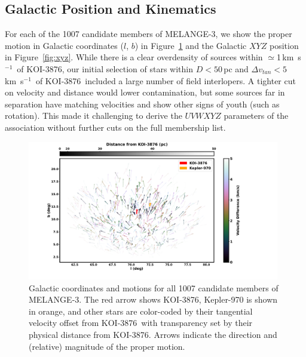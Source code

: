 \documentclass[twocolumn, linenumbers]{aastex631}
\newcommand{\association}{MELANGE-3}
\newcommand{\starname}{KOI-3876}
\newcommand\kms{km~s$^{-1}$}
\begin{document}


\subsection{Galactic Position and Kinematics}\label{sec:kinametics}

For each of the 1007 candidate members of \association, we show the proper motion in Galactic coordinates ($l$, $b$) in Figure~\ref{fig:ProperMotion} and the Galactic $XYZ$ position in Figure~\ref{fig:xyz}. While there is a clear overdensity of sources within $\simeq$1\,\kms\ of \starname, our initial selection of stars within $D < 50$\,pc and $\Delta v_{tan} < 5$\,\kms\ of \starname\ included a large number of field interlopers. A tighter cut on velocity and distance would lower contamination, but some sources far in separation have matching velocities and show other signs of youth (such as rotation). This made it challenging to derive the $UVWXYZ$ parameters of the association without further cuts on the full membership list.

\begin{figure}[tbhp]
    \centering
    \includegraphics[trim=90 0 150 0,clip=true,width=0.98\textwidth]{propmotion.pdf}
    \caption{Galactic coordinates and motions for all 1007 candidate members of \association. The red arrow shows \starname, Kepler-970 is shown in orange, and other stars are color-coded by their tangential velocity offset from \starname\ with transparency set by their physical distance from \starname. Arrows indicate the direction and (relative) magnitude of the proper motion. 
    }
    \label{fig:ProperMotion}
\end{figure}
\end{document}
